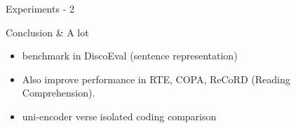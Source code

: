 \documentclass[10pt]{beamer}
\begin{document}
\begin{frame}{Experiments - 2}
    \begin{figure}
        \begin{subfigure}{.5\textwidth}
            \centering
        \end{subfigure}%
        \begin{subfigure}{.5\textwidth}
            \centering
        \end{subfigure} 
    \end{figure}
\end{frame}

\begin{frame}{Conclusion \& A lot}
    \begin{itemize}
        \item benchmark in DiscoEval (sentence representation) 
        \item Also improve performance in RTE, COPA, ReCoRD (Reading Comprehension).
        \item uni-encoder verse isolated coding comparison
    \end{itemize}
\end{frame}
\end{document}
